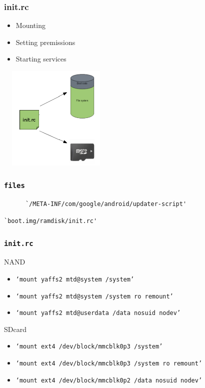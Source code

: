 \documentclass{beamer}
\begin{document}
\begin{frame}
  \frametitle{init.rc}
  \begin{itemize}
  \item Mounting
  \item Setting premissions
  \item Starting services
  \end{itemize}
    \begin{center}
      \includegraphics[width=5.5cm, height=5cm]{initrc.png}
    \end{center}
\end{frame}
\begin{frame}[fragile]
  \frametitle{\texttt{files}}
  \begin{semiverbatim}
    \pause
    \begin{lstlisting}
      `/META-INF/com/google/android/updater-script'
    \end{lstlisting}

    \pause
    \begin{lstlisting}[firstnumber=last]
      `boot.img/ramdisk/init.rc'
    \end{lstlisting}
  \end{semiverbatim}
\end{frame}
\begin{frame}
\frametitle{\tt{init.rc}}
{}
\begin{block}
  {NAND}
  \begin{itemize}
  \item \tt{`mount yaffs2 mtd@system /system'} \\
  \item \tt{`mount yaffs2 mtd@system /system ro remount'} \\
  \item \tt{`mount yaffs2 mtd@userdata /data nosuid nodev'} \\
  \end{itemize}
\end{block}
\begin{block}
  {SDcard}
  \begin{itemize}
  \item \tt{`mount ext4 /dev/block/mmcblk0p3 /system'}
  \item \tt{`mount ext4 /dev/block/mmcblk0p3 /system ro remount'}
  \item \tt{`mount ext4 /dev/block/mmcblk0p2 /data nosuid nodev'}
  \end{itemize}
\end{block}
\end{frame}
\end{document}
